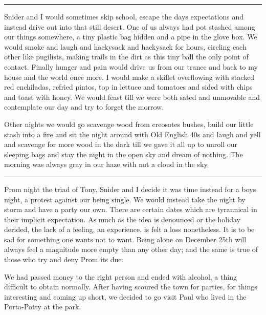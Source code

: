 \documentclass[ebook, 10pt, openright, onecolumn]{memoir}
\newcommand*\td[1]{
  \todo[inline]{
     #1 
  }
}
\newcommand*\starbreak{\fancybreak*{* * *\\}}
\newcommand*\finish{\td{ ----- Finish this section -----}}
\begin{document}
\starbreak

Snider and I would sometimes skip school, escape the days expectations and
instead drive out into that still desert.  One of us always had pot stashed
among our things somewhere, a tiny plastic bag hidden and a pipe in the glove
box. We would smoke and laugh and hackysack and hackysack for hours, circling
each other like pugilists, making trails in the dirt as this tiny ball the only
point of contact.  Finally hunger and pain would drive us from our trance and
back to my house and the world once more.  I would make a skillet overflowing
with stacked red enchiladas, refried pintos, top in lettuce and tomatoes and
sided with chips and toast with honey.  We would feast till we were both sated
and unmovable and contemplate our day and try to forget the morrow.

Other nights we would go scavenge wood from creosotes bushes, build our little
stash into a fire and sit the night around with Old English 40s and laugh and
yell and scavenge for more wood in the dark till we gave it all up to unroll our
sleeping bags and stay the night in the open sky and dream of nothing.  The
morning was always gray in our haze with not a cloud in the sky.  


\finish
\starbreak


Prom night the triad of Tony, Snider and I decide it was time instead for a boys
night, a protest against our being single.  We would instead take the night by
storm and have a party our own.  There are certain dates which are tyrannical in
their implicit expectation.  As much as the idea is denounced or the holiday
derided, the lack of a feeling, an experience, is felt a loss nonetheless.  It
is to be sad for something one wants not to want.  Being alone on December 25th
will always feel a magnitude more empty than any other day; and the same is true
of those who try and deny Prom its due.

We had passed money to the right person and ended with alcohol, a thing
difficult to obtain normally.  After having scoured the town for parties, for
things interesting and coming up short, we decided to go visit Paul who lived in
the Porta-Potty at the park.
\end{document}
